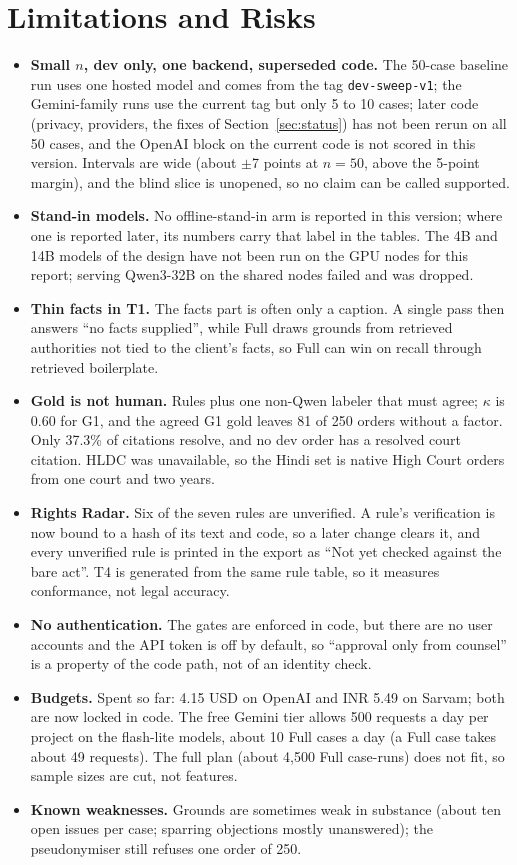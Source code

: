 \section{Limitations and Risks}

\begin{itemize}\setlength\itemsep{0pt}
\item \textbf{Small $n$, dev only, one backend, superseded code.} The 50-case baseline run uses one hosted model and comes from the tag \texttt{dev-sweep-v1}; the Gemini-family runs use the current tag but only 5 to 10 cases; later code (privacy, providers, the fixes of Section~\ref{sec:status}) has not been rerun on all 50 cases, and the OpenAI block on the current code is not scored in this version. Intervals are wide (about $\pm$7 points at $n=50$, above the 5-point margin), and the blind slice is unopened, so no claim can be called supported.
\item \textbf{Stand-in models.} No offline-stand-in arm is reported in this version; where one is reported later, its numbers carry that label in the tables. The 4B and 14B models of the design have not been run on the GPU nodes for this report; serving Qwen3-32B on the shared nodes failed and was dropped.
\item \textbf{Thin facts in T1.} The facts part is often only a caption. A single pass then answers ``no facts supplied'', while Full draws grounds from retrieved authorities not tied to the client's facts, so Full can win on recall through retrieved boilerplate.
\item \textbf{Gold is not human.} Rules plus one non-Qwen labeler that must agree; $\kappa$ is 0.60 for G1, and the agreed G1 gold leaves 81 of 250 orders without a factor. Only 37.3\% of citations resolve, and no dev order has a resolved court citation. HLDC was unavailable, so the Hindi set is native High Court orders from one court and two years.
\item \textbf{Rights Radar.} Six of the seven rules are unverified. A rule's verification is now bound to a hash of its text and code, so a later change clears it, and every unverified rule is printed in the export as ``Not yet checked against the bare act''. T4 is generated from the same rule table, so it measures conformance, not legal accuracy.
\item \textbf{No authentication.} The gates are enforced in code, but there are no user accounts and the API token is off by default, so ``approval only from counsel'' is a property of the code path, not of an identity check.
\item \textbf{Budgets.} Spent so far: 4.15 USD on OpenAI and INR 5.49 on Sarvam; both are now locked in code. The free Gemini tier allows 500 requests a day per project on the flash-lite models, about 10 Full cases a day (a Full case takes about 49 requests). The full plan (about 4,500 Full case-runs) does not fit, so sample sizes are cut, not features.
\item \textbf{Known weaknesses.} Grounds are sometimes weak in substance (about ten open issues per case; sparring objections mostly unanswered); the pseudonymiser still refuses one order of 250.
\end{itemize}
